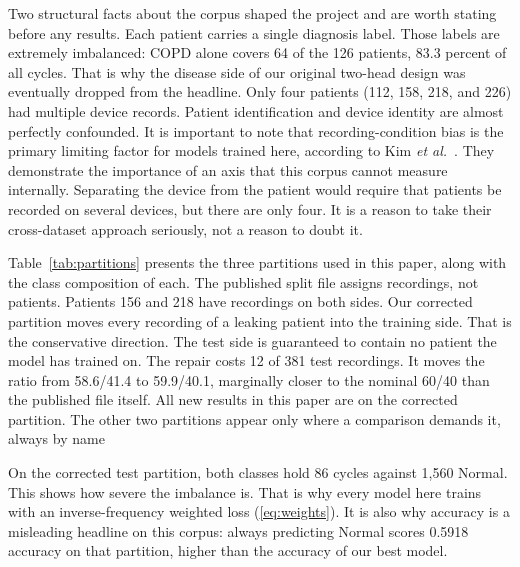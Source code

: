 \documentclass[journal,onecolumn]{IEEEtran}
\begin{document}
Two structural facts about the corpus shaped the project and are worth stating before any results. Each patient carries a single diagnosis label. Those labels are extremely imbalanced: COPD alone covers 64 of the 126 patients, 83.3 percent of all cycles. That is why the disease side of our original two-head design was eventually dropped from the headline. Only four patients (112, 158, 218, and 226) had multiple device records. Patient identification and device identity are almost perfectly confounded. It is important to note that recording-condition bias is the primary limiting factor for models trained here, according to Kim \emph{et al.}~\cite{kim2025metadata}. They demonstrate the importance of an axis that this corpus cannot measure internally. Separating the device from the patient would require that patients be recorded on several devices, but there are only four. It is a reason to take their cross-dataset approach seriously, not a reason to doubt it.

Table~\ref{tab:partitions} presents the three partitions used in this paper, along with the class composition of each. The published split file assigns recordings, not patients. Patients 156 and 218 have recordings on both sides. Our corrected partition moves every recording of a leaking patient into the training side. That is the conservative direction. The test side is guaranteed to contain no patient the model has trained on. The repair costs 12 of 381 test recordings. It moves the ratio from 58.6/41.4 to 59.9/40.1, marginally closer to the nominal 60/40 than the published file itself. All new results in this paper are on the corrected partition. The other two partitions appear only where a comparison demands it, always by name

On the corrected test partition, both classes hold 86 cycles against 1,560 Normal. This shows how severe the imbalance is. That is why every model here trains with an inverse-frequency weighted loss (\ref{eq:weights}). It is also why accuracy is a misleading headline on this corpus: always predicting Normal scores 0.5918 accuracy on that partition, higher than the accuracy of our best model.
\end{document}
